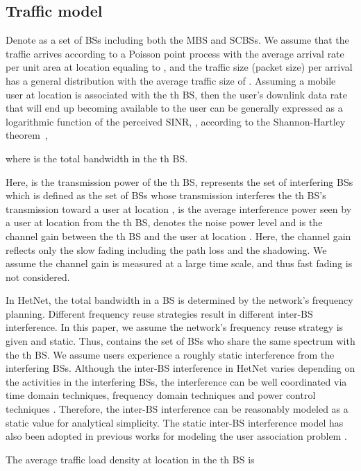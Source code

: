 \documentclass[journal]{IEEEtran}
\theoremstyle{definition}
\begin{document}
\subsection{Traffic model}
Denote  as a set of BSs including both the MBS and SCBSs. We assume that the traffic arrives according to a Poisson point process with the average arrival rate per unit area at location  equaling to , and the traffic size (packet size) per arrival has a general distribution with the average traffic size of . Assuming a mobile user at location  is associated with the th BS, then the user's downlink data rate  that will end up becoming available to the user can be generally expressed as a logarithmic function of the perceived SINR, , according to the Shannon-Hartley theorem~\cite{Kim:2012:DOU},

where  is the total bandwidth in the th BS.

Here,  is the transmission power of the th BS,  represents the set of interfering BSs which is defined as the set of BSs whose transmission interferes the th BS's transmission toward a user at location ,  is the average interference power seen by a user at location  from the th BS,  denotes the noise power level and  is the channel gain between the th BS and the user at location . Here, the channel gain reflects only the slow fading including the path loss and the shadowing. We assume the channel gain is measured at a large time scale, and thus fast fading is not considered.

In HetNet, the total bandwidth in a BS is determined by the network's frequency planning. Different frequency reuse strategies result in different inter-BS interference. In this paper, we assume the network's frequency reuse strategy is given and static. Thus,  contains the set of BSs who share the same spectrum with the th BS. We assume users experience a roughly static interference from the interfering BSs. Although the inter-BS interference in HetNet varies depending on the activities in the interfering BSs, the interference can be well coordinated via time domain techniques, frequency domain techniques and power control techniques \cite{Lopez:2011:EICIC}. Therefore, the inter-BS interference can be reasonably modeled as a static value for analytical simplicity. The static inter-BS interference model has also been adopted in previous works for modeling the user association problem \cite{Son:2009:DAL, Kim:2012:DOU}.


The average traffic load density at location  in the th BS is
\end{document}
